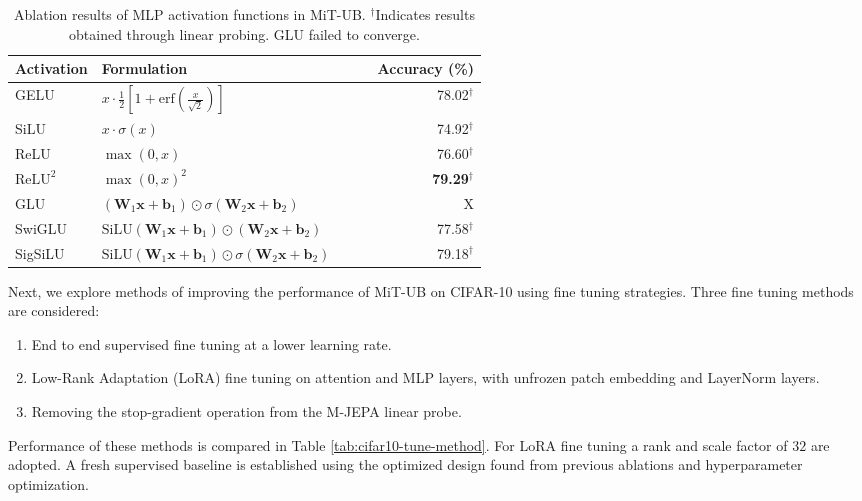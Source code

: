 \documentclass[12pt]{article}
\newcommand{\reluTwo}{$\text{ReLU}^2$}
\begin{document}
\begin{table}[H]
    \centering
    \begin{tabular}{p{0.15\linewidth}p{0.4\linewidth}r}
        \toprule
        Activation & Formulation & Accuracy (\%) \\
        \midrule
        GELU & \( x \cdot \frac{1}{2} \left[1 + \mathrm{erf}\left(\frac{x}{\sqrt{2}}\right)\right] \) & 78.02$^{\dagger}$ \\
        SiLU & \( x \cdot \sigma(x) \) & 74.92$^{\dagger}$ \\
        ReLU & \( \max(0, x) \) & 76.60$^{\dagger}$ \\
        \reluTwo & \( \max(0, x)^2 \) & \textbf{79.29}$^{\dagger}$ \\
        \midrule
        GLU & \( (\mathbf{W}_1 \mathbf{x} + \mathbf{b}_1) \odot \sigma(\mathbf{W}_2 \mathbf{x} + \mathbf{b}_2) \) & X \\
        SwiGLU & \( \mathrm{SiLU}(\mathbf{W}_1 \mathbf{x} + \mathbf{b}_1) \odot (\mathbf{W}_2 \mathbf{x} + \mathbf{b}_2) \) & 77.58$^{\dagger}$ \\
        SigSiLU & \( \mathrm{SiLU}(\mathbf{W}_1 \mathbf{x} + \mathbf{b}_1) \odot \sigma(\mathbf{W}_2 \mathbf{x} + \mathbf{b}_2) \) & 79.18$^{\dagger}$ \\
        \bottomrule
    \end{tabular}
    \caption{Ablation results of MLP activation functions in MiT-UB. $^\dagger$Indicates results obtained through linear probing. GLU failed to converge.}
    \label{tab:cifar10-accuracies-activation}
\end{table}


Next, we explore methods of improving the performance of MiT-UB on CIFAR-10 using fine tuning strategies. Three fine tuning methods are considered:

\begin{enumerate}
    \item End to end supervised fine tuning at a lower learning rate.
    \item Low-Rank Adaptation (LoRA) \cite{hu2021lora} fine tuning on attention and MLP layers, with unfrozen patch embedding and LayerNorm layers.
    \item Removing the stop-gradient operation from the M-JEPA linear probe.
\end{enumerate}

Performance of these methods is compared in Table \ref{tab:cifar10-tune-method}. For LoRA fine tuning a rank and scale factor of $32$ are adopted. A fresh supervised baseline is established using the optimized design found from previous
ablations and hyperparameter optimization.
\end{document}
